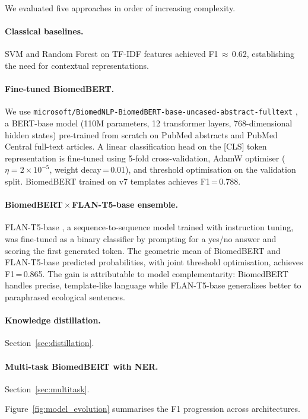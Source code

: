 \documentclass[12pt,a4paper]{article}
\begin{document}
We evaluated five approaches in order of increasing complexity.

\paragraph{Classical baselines.}
SVM and Random Forest on TF-IDF features achieved F1\,$\approx$\,0.62,
establishing the need for contextual representations.

\paragraph{Fine-tuned BiomedBERT.}
We use \texttt{microsoft/BiomedNLP-BiomedBERT-base-uncased-abstract-fulltext}
\citep{gu2021domain}, a BERT-base model (110M parameters, 12 transformer
layers, 768-dimensional hidden states) pre-trained from scratch on PubMed
abstracts and PubMed Central full-text articles. A linear classification
head on the [CLS] token representation is fine-tuned using 5-fold
cross-validation, AdamW optimiser ($\eta = 2 \times 10^{-5}$, weight
decay\,=\,0.01), and threshold optimisation on the validation split.
BiomedBERT trained on v7 templates achieves F1\,=\,0.788.

\paragraph{BiomedBERT\,$\times$\,FLAN-T5-base ensemble.}
FLAN-T5-base \citep{chung2022scaling}, a sequence-to-sequence model trained
with instruction tuning, was fine-tuned as a binary classifier by prompting
for a yes/no answer and scoring the first generated token. The geometric
mean of BiomedBERT and FLAN-T5-base predicted probabilities, with joint
threshold optimisation, achieves F1\,=\,0.865. The gain is attributable to
model complementarity: BiomedBERT handles precise, template-like language
while FLAN-T5-base generalises better to paraphrased ecological sentences.

\paragraph{Knowledge distillation.}
Section~\ref{sec:distillation}.

\paragraph{Multi-task BiomedBERT with NER.}
Section~\ref{sec:multitask}.

Figure~\ref{fig:model_evolution} summarises the F1 progression across architectures.
\end{document}
